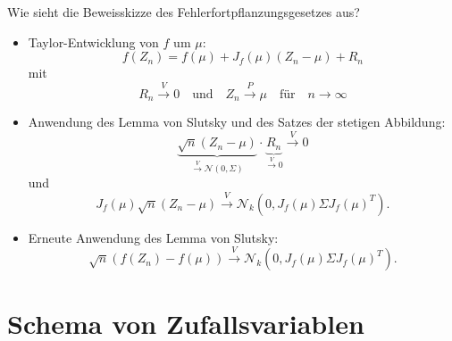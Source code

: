 \begin{QandA}
    \item Wie sieht die Beweisskizze des Fehlerfortpflanzungsgesetzes aus?
    \begin{answered}
        \begin{itemize}
            \item Taylor-Entwicklung von $f$ um $\mu$:
                  \[
                      f(Z_n) = f(\mu) + J_f(\mu)(Z_n - \mu) + R_n
                  \]
                  mit
                  \[
                      R_n \xrightarrow{V} 0 \quad \text{und} \quad Z_n \xrightarrow{P} \mu \quad \text{für} \quad n \to \infty
                  \]
            \item Anwendung des Lemma von Slutsky und des Satzes der stetigen Abbildung:
                  \[
                      \underbrace{\sqrt{n} (Z_n - \mu)}_{\xrightarrow{V} \mathcal{N}(0, \Sigma)} \cdot \underbrace{R_n}_{\xrightarrow{V} 0} \xrightarrow{V} 0
                  \]
                  und
                  \[
                      J_f(\mu) \sqrt{n}(Z_n - \mu) \xrightarrow{V} \mathcal{N}_k(0, J_f(\mu) \Sigma J_f(\mu)^T).
                  \]
            \item Erneute Anwendung des Lemma von Slutsky:
                  \[
                      \sqrt{n}(f(Z_n) - f(\mu)) \xrightarrow{V} \mathcal{N}_k(0, J_f(\mu) \Sigma J_f(\mu)^T).
                  \]
        \end{itemize}
    \end{answered}
\end{QandA}

\newpage
\section*{Schema von Zufallsvariablen}

